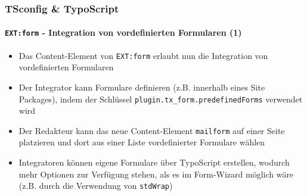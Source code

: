 \begin{frame}[fragile]
	\frametitle{TSconfig \& TypoScript}
	\framesubtitle{\texttt{EXT:form} - Integration von vordefinierten Formularen (1)}

	\lstset{basicstyle=\tiny\ttfamily}

	\begin{itemize}

		\item Das Content-Element von \texttt{EXT:form} erlaubt nun die Integration von vordefinierten Formularen

		\item Der Integrator kann Formulare definieren (z.B. innerhalb eines Site Packages), indem der Schlüssel \texttt{plugin.tx\_form.predefinedForms} verwendet wird

		\item Der Redakteur kann das neue Content-Element \texttt{mailform} auf einer Seite platzieren und dort aus einer Liste vordefinierter Formulare wählen

		\item Integratoren können eigene Formulare über TypoScript erstellen, wodurch mehr Optionen zur Verfügung stehen, als es im Form-Wizard möglich wäre (z.B. durch die Verwendung von \texttt{stdWrap})

	\end{itemize}

\end{frame}

